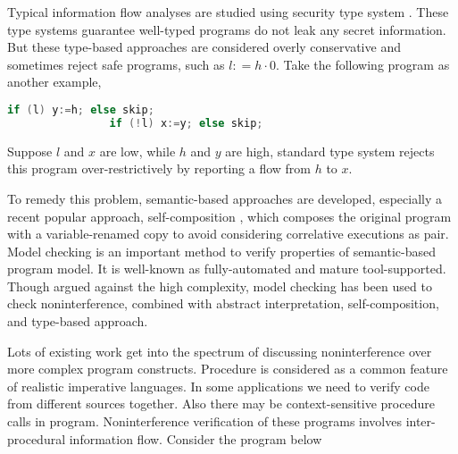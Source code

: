 \documentclass{llncs}
\begin{document}
Typical information flow analyses are studied using security type
system
\cite{DBLP:journals/jcs/VolpanoIS96}\cite{DBLP:conf/tapsoft/VolpanoS97}\cite{DBLP:conf/popl/SmithV98}\cite{DBLP:conf/popl/HeintzeR98}\cite{mcps:sabefeld}.
These type systems guarantee well-typed programs do not leak any
secret information. But these type-based approaches are considered
overly conservative and sometimes reject safe programs, such as
$l\mathrel{\mathop:}= h\cdot 0$. Take the following program as
another example,

\begin{minipage}[t]{4.8in}
\begin{lstlisting}[language=C,basicstyle=\footnotesize]
                if (l) y:=h; else skip;
                if (!l) x:=y; else skip;
\end{lstlisting}
\end{minipage}
Suppose $l$ and $x$ are \textsf{low}, while $h$ and $y$ are
\textsf{high}, standard type
system\cite{DBLP:journals/jcs/VolpanoIS96} rejects this program
over-restrictively by reporting a flow from $h$ to $x$.

To remedy this problem, semantic-based
approaches\cite{DBLP:journals/scp/JoshiL00}\cite{DBLP:journals/lisp/SabelfeldS01}
are developed, especially a recent popular approach,
self-composition
\cite{DBLP:conf/csfw/BartheDR04}\cite{DBLP:conf/sas/TerauchiA05},
which composes the original program with a variable-renamed copy to
avoid considering correlative executions as pair. Model checking is
an important method to verify properties of semantic-based program
model. It is well-known as fully-automated and mature
tool-supported. Though argued against the high complexity, model
checking has been used to check noninterference, combined with
abstract interpretation\cite{DBLP:journals/fuin/FrancescoST03},
self-composition\cite{DBLP:conf/sas/TerauchiA05}\cite{DBLP:conf/pldi/UnnoKY06},
and type-based approach\cite{DBLP:conf/pldi/UnnoKY06}.

Lots of existing work get into the spectrum of discussing
noninterference over more complex program constructs. Procedure is
considered as a common feature of realistic imperative languages. In
some applications we need to verify code from different sources
together. Also there may be context-sensitive procedure calls in
program. Noninterference verification of these programs involves
inter-procedural information flow. Consider the program below
\end{document}
